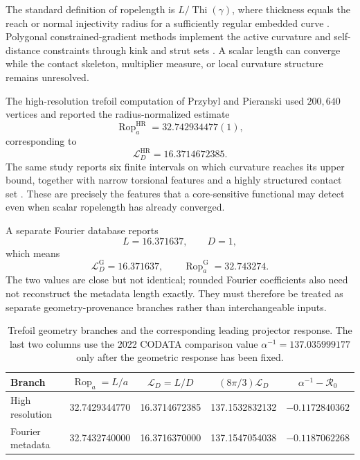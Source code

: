 \documentclass[aps,pre,preprint,notitlepage,nofootinbib,superscriptaddress]{revtex4-2}
\newcommand{\Rop}{\operatorname{Rop}}
\newcommand{\calL}{\mathcal L}
\newcommand{\Rgeom}{\mathscr R_{0}}
\begin{document}
The standard definition of ropelength is $L/\operatorname{Thi}(\gamma)$, where thickness equals the reach or normal injectivity radius for a sufficiently regular embedded curve \cite{CantarellaKusnerSullivan2002}.  Polygonal constrained-gradient methods implement the active curvature and self-distance constraints through kink and strut sets \cite{AshtonCantarellaPiatekRawdon2011}.  A scalar length can converge while the contact skeleton, multiplier measure, or local curvature structure remains unresolved.

The high-resolution trefoil computation of Przybyl and Pieranski used $200{,}640$ vertices and reported the radius-normalized estimate
\begin{equation}
  \Rop_a^{\mathrm{HR}}=32.742934477(1),
  \label{eq:HR-rop}
\end{equation}
corresponding to
\begin{equation}
  \calL_D^{\mathrm{HR}}=16.3714672385.
\end{equation}
The same study reports six finite intervals on which curvature reaches its upper bound, together with narrow torsional features and a highly structured contact set \cite{PrzybylPieranski2014}.  These are precisely the features that a core-sensitive functional may detect even when scalar ropelength has already converged.

A separate Fourier database reports~\cite{Gilbert2016}
\begin{equation}
  L=16.371637,\qquad D=1,
  \label{eq:Gilbert}
\end{equation}
which means
\begin{equation}
  \calL_D^{\mathrm{G}}=16.371637,
  \qquad
  \Rop_a^{\mathrm{G}}=32.743274.
\end{equation}
The two values are close but not identical; rounded Fourier coefficients also need not reconstruct the metadata length exactly.  They must therefore be treated as separate geometry-provenance branches rather than interchangeable inputs.

\begin{table}[t]
\caption{Trefoil geometry branches and the corresponding leading projector response.  The last two columns use the 2022 CODATA comparison value $\alpha^{-1}=137.035999177$ only after the geometric response has been fixed.}
\label{tab:trefoil-branches}
\begin{ruledtabular}
\begin{tabular}{lcccc}
Branch & $\Rop_a=L/a$ & $\calL_D=L/D$ & $(8\pi/3)\calL_D$ & $\alpha^{-1}-\Rgeom$\\
\hline
High resolution & 32.7429344770 & 16.3714672385 & 137.1532832132 & $-0.1172840362$\\
Fourier metadata & 32.7432740000 & 16.3716370000 & 137.1547054038 & $-0.1187062268$\\
\end{tabular}
\end{ruledtabular}
\end{table}
\end{document}
